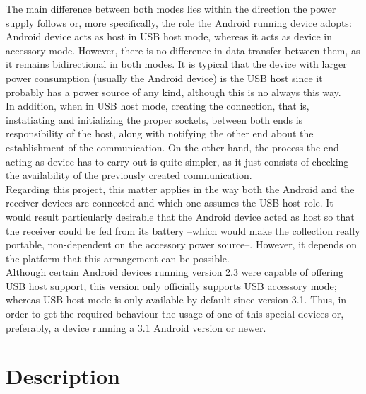 			The main difference between both modes lies within the direction the power supply follows or, more
			specifically, the role the Android running device adopts: Android device acts as host in USB host
			mode, whereas it acts as device in accessory mode. However, there is no difference in data transfer
			between them, as it remains bidirectional in both modes. It is typical that the device with larger
			power consumption (usually the Android device) is the USB host since it probably has a power source
			of any kind, although this is no always this way.\\

			In addition, when in USB host mode, creating the connection, that is, instatiating and initializing
			the proper sockets, between both ends is responsibility of the host, along with notifying the other
			end about the establishment of the communication. On the other hand, the process the end acting as
			device has to carry out is quite simpler, as it just consists of checking the availability of the
			previously created communication.\\

			Regarding this project, this matter applies in the way both the Android and the receiver devices are
			connected and which one assumes the USB host role. It would result particularly desirable that the
			Android device acted as host so that the receiver could be fed from its battery --which would make the
			collection really portable, non-dependent on the accessory power source--. However, it depends on
			the platform that this arrangement can be possible.\\

			Although certain Android devices running version 2.3 were capable of offering USB host support, this
			version only officially supports USB accessory mode; whereas USB host mode is only available by
			default since version 3.1. Thus, in order to get the required behaviour the usage of one of this
			special devices or, preferably, a device running a 3.1 Android version or newer.

	\section{Description}
	\label{sec:hw-descr}



